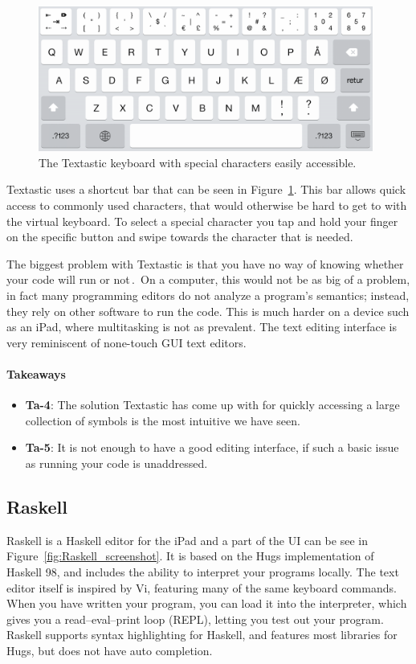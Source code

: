 \begin{figure}
	\centering
		\includegraphics[width=110mm]{diagrams/textastic_keyboard_screenshot.png}
	\caption{The Textastic keyboard with special characters easily accessible.}
\label{fig:textastic_keyboard_screenshot}
\end{figure}

Textastic uses a shortcut bar that can be seen in Figure~\ref{fig:textastic_keyboard_screenshot}. This bar allows quick access to commonly used characters, that would otherwise be hard to get to with the virtual keyboard. To select a special character you tap and hold your finger on the specific button and swipe towards the character that is needed. 

The biggest problem with Textastic is that you have no way of knowing whether your code will run or not\,\cite{nielsen1990heuristic}.\ On a computer, this would not be as big of a problem, in fact many programming editors do not analyze a program's semantics; instead, they rely on other software to run the code. This is much harder on a device such as an iPad, where multitasking is not as prevalent. The text editing interface is very reminiscent of none-touch GUI text editors.

\paragraph{Takeaways}
\begin{itemize}
	\item \textbf{Ta-4}: The solution Textastic has come up with for quickly accessing a large collection of symbols is the most intuitive we have seen.
	\item \textbf{Ta-5}: It is not enough to have a good editing interface, if such a basic issue as running your code is unaddressed.
\end{itemize}


\subsection{Raskell}
\label{subsub:Raskell}
Raskell is a Haskell editor for the iPad and a part of the UI can be see in Figure~\ref{fig:Raskell_screenshot}. It is based on the Hugs implementation of Haskell 98, and includes the ability to interpret your programs locally. The text editor itself is inspired by Vi, featuring many of the same keyboard commands. When you have written your program, you can load it into the interpreter, which gives you a read–eval–print loop (REPL), letting you test out your program. Raskell supports syntax highlighting for Haskell, and features most libraries for Hugs, but does not have auto completion.

